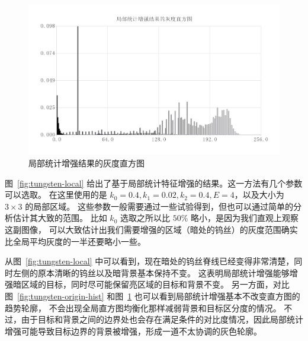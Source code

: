 \documentclass{hitgsrep}
\begin{document}
\begin{figure}[!htb]
    \centering
    \includegraphics[width=0.9\linewidth]{tungsten-local-hist.png}
    \caption{局部统计增强结果的灰度直方图}
    \label{fig:tungsten-local-hist}
\end{figure}

图~\ref{fig:tungsten-local} 给出了基于局部统计特征增强的结果。这一方法有几个参数可以选取。
在这里使用的是 $k_0=0.4,k_1=0.02,k_2=0.4,E=4$，以及大小为 $3\times3$ 的局部区域。
这些参数一般需要通过一些试验得到，但也可以通过简单的分析估计其大致的范围。
比如 $k_0$ 选取之所以比 $50\%$ 略小，是因为我们直观上观察这副图像，
可以大致估计出我们需要增强的区域（暗处的钨丝）的灰度范围确实比全局平均灰度的一半还要略小一些。

从图~\ref{fig:tungsten-local} 中可以看到，现在暗处的钨丝脊线已经变得非常清楚，同时左侧的原本清晰的钨丝以及暗背景基本保持不变。
这表明局部统计增强能够增强暗区域的目标，同时尽可能保留亮区域的目标和背景不变。
另一方面，对比图~\ref{fig:tungsten-origin-hist} 和图~\ref{fig:tungsten-local-hist} 也可以看到局部统计增强基本不改变直方图的趋势轮廓，
不会出现全局直方图均衡化那样减弱背景和目标区分度的情况。
不过，由于目标和背景之间的边界处也会存在满足条件的对比度情况，因此局部统计增强可能导致目标边界的背景被增强，形成一道不太协调的灰色轮廓。

\end{document}
